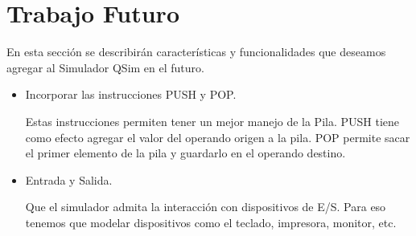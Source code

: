 \section{Trabajo Futuro}

En esta sección se describirán características y funcionalidades que deseamos agregar al Simulador QSim en el futuro.

\begin{itemize}

\item Incorporar las instrucciones PUSH y POP.

Estas instrucciones permiten tener un mejor manejo de la Pila. 
PUSH tiene como efecto agregar el valor del operando origen a la pila. 
POP permite sacar el primer elemento de la pila y guardarlo en el operando destino.

\item Entrada y Salida.

Que el simulador admita la interacción con dispositivos de E/S. Para eso tenemos que modelar dispositivos como el teclado, impresora, monitor, etc.

\end{itemize}
